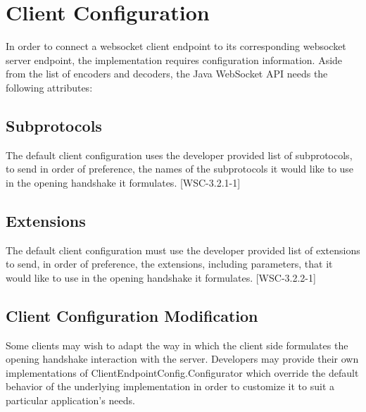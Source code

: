 \section{Client Configuration}

In order to connect a websocket client endpoint to its corresponding websocket server endpoint, the implementation requires configuration information. Aside from the list of encoders and decoders, the Java WebSocket API needs the following attributes:

\subsection{Subprotocols}

The default client configuration uses the developer provided list of subprotocols, to send in order of preference, the names of the subprotocols it would like to use in the opening handshake it formulates. [WSC-3.2.1-1]

\subsection{Extensions}

The default client configuration must use the developer provided list of extensions to send, in order of preference, the extensions, including parameters, that it would like to use in the opening handshake it formulates. [WSC-3.2.2-1]

\subsection{Client Configuration Modification}

Some clients may wish to adapt the way in which the client side formulates the opening handshake interaction with the server. Developers may provide their own implementations of ClientEndpointConfig.Configurator which override the default behavior of the underlying implementation in order to customize it to suit a particular application’s needs.
